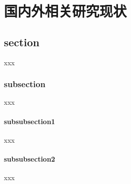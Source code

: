 \chapter{国内外相关研究现状}
\vspace{7pt}

\section{section}
xxx

\subsection{subsection}
xxx

\subsubsection{subsubsection1}
xxx

\subsubsection{subsubsection2}
xxx
